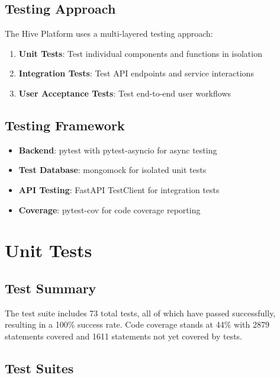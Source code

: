 \documentclass[12pt,a4paper]{report}
\begin{document}
\subsection{Testing Approach}

The Hive Platform uses a multi-layered testing approach:

\begin{enumerate}
    \item \textbf{Unit Tests}: Test individual components and functions in isolation
    \item \textbf{Integration Tests}: Test API endpoints and service interactions
    \item \textbf{User Acceptance Tests}: Test end-to-end user workflows
\end{enumerate}

\subsection{Testing Framework}

\begin{itemize}
    \item \textbf{Backend}: pytest with pytest-asyncio for async testing
    \item \textbf{Test Database}: mongomock for isolated unit tests
    \item \textbf{API Testing}: FastAPI TestClient for integration tests
    \item \textbf{Coverage}: pytest-cov for code coverage reporting
\end{itemize}

\section{Unit Tests}

\subsection{Test Summary}

The test suite includes 73 total tests, all of which have passed successfully, resulting in a 100\% success rate. Code coverage stands at 44\% with 2879 statements covered and 1611 statements not yet covered by tests.

\subsection{Test Suites}
\end{document}
